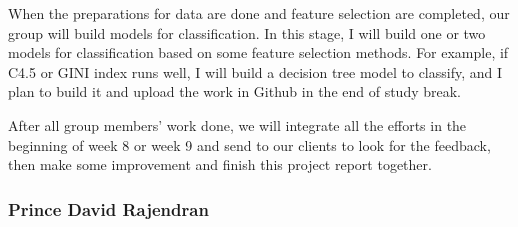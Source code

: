 \documentclass[11pt,a4paper]{article}
\begin{document}
 

When the preparations for data are done and feature selection are completed, our group will build models for classification. In this stage, I will build one or two models for classification based on some feature selection methods. For example, if C4.5 or GINI index runs well, I will build a decision tree model to classify, and I plan to build it and upload the work in Github in the end of study break. 

 

After all group members’ work done, we will integrate all the efforts in the beginning of week 8 or week 9 and send to our clients to look for the feedback, then make some improvement and finish this project report together.  
\subsubsection*{Prince David Rajendran}
\end{document}

